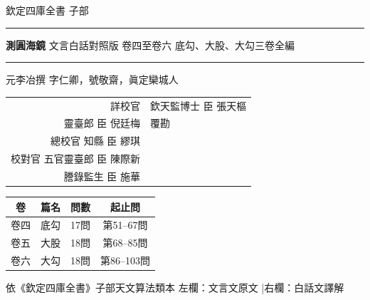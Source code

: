 \documentclass[11pt,a4paper]{article}
\begin{document}
\begin{titlepage}
\begin{center}
\vspace*{1.5cm}
{\fontsize{14}{18}\selectfont 欽定四庫全書}
\vspace{1cm}
{\fontsize{12}{16}\selectfont 子部}
\vspace{1.5cm}
\rule{0.8\textwidth}{1.5pt}
\vspace{0.8cm}
{\fontsize{26}{34}\selectfont\bfseries\color{titlecolor} 測圓海鏡}
\vspace{0.4cm}
{\fontsize{14}{20}\selectfont\color{volcolor} 文言白話對照版}
\vspace{0.3cm}
{\fontsize{16}{22}\selectfont 卷四至卷六}
\vspace{0.2cm}
{\fontsize{11}{15}\selectfont\color{notecolor} 底勾、大股、大勾三卷全編}
\vspace{0.6cm}
\rule{0.8\textwidth}{1.5pt}
\vspace{1.5cm}
{\fontsize{14}{18}\selectfont 元\quad 李冶\quad 撰}
\vspace{0.3cm}
{\fontsize{11}{15}\selectfont\color{notecolor} 字仁卿，號敬齋，眞定欒城人}
\vspace{1.5cm}
{\fontsize{12}{16}\selectfont\color{notecolor}
\begin{tabular}{rl}
詳校官 & 欽天監博士 臣 張天樞 \\
靈臺郎 臣 倪廷梅 & 覆勘 \\
總校官 知縣 臣 繆琪 & \\
校對官 五官靈臺郎 臣 陳際新 & \\
謄錄監生 臣 施華 & \\
\end{tabular}
}
\vspace{1.5cm}
{\fontsize{12}{16}\selectfont\color{notecolor}
\begin{tabular}{|c|c|c|c|}
\hline
\textbf{卷} & \textbf{篇名} & \textbf{問數} & \textbf{起止問} \\
\hline
卷四 & 底勾 & 17問 & 第51--67問 \\
卷五 & 大股 & 18問 & 第68--85問 \\
卷六 & 大勾 & 18問 & 第86--103問 \\
\hline
\end{tabular}
}
\vfill
{\small 依《欽定四庫全書》子部天文算法類本}
\vspace{0.5cm}
{\small\color{notecolor} 左欄：文言文原文 \quad|\quad 右欄：白話文譯解}
\end{center}
\end{titlepage}
\end{document}
